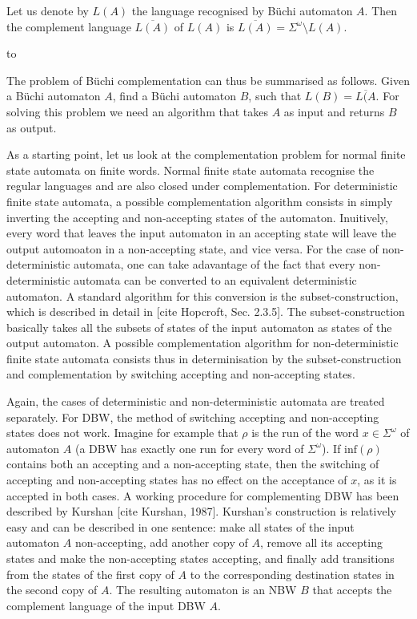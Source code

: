 \documentclass{scrreprt}
\begin{document}
Let us denote by $L(A)$ the language recognised by Büchi automaton $A$. Then the complement language $\overline{L(A)}$ of $L(A)$ is $\overline{L(A)} = \Sigma^\omega \setminus L(A)$.

\hbox to 

The problem of Büchi complementation can thus be summarised as follows. Given a Büchi automaton $A$, find a Büchi automaton $B$, such that $L(B) = \overline{L(A}$. For solving this problem we need an algorithm that takes $A$ as input and returns $B$ as output. 

As a starting point, let us look at the complementation problem for normal finite state automata on finite words. Normal finite state automata recognise the regular languages and are also closed under complementation. For deterministic finite state automata, a possible complementation algorithm consists in simply inverting the accepting and non-accepting states of the automaton. Inuitively, every word that leaves the input automaton in an accepting state will leave the output automoaton in a non-accepting state, and vice versa. For the case of non-deterministic automata, one can take adavantage of the fact that every non-deterministic automata can be converted to an equivalent deterministic automaton. A standard algorithm for this conversion is the subset-construction, which is described in detail in [cite Hopcroft, Sec. 2.3.5]. The subset-construction basically takes all the subsets of states of the input automaton as states of the output automaton. A possible complementation algorithm for non-deterministic finite state automata consists thus in determinisation by the subset-construction and complementation by switching accepting and non-accepting states.

Again, the cases of deterministic and non-deterministic automata are treated separately. For DBW, the method of switching accepting and non-accepting states does not work. Imagine for example that $\rho$ is the run of the word $x \in \Sigma^\omega$ of automaton $A$ (a DBW has exactly one run for every word of $\Sigma^\omega$). If $\textrm{inf}(\rho)$ contains both an accepting and a non-accepting state, then the switching of accepting and non-accepting states has no effect on the acceptance of $x$, as it is accepted in both cases. A working procedure for complementing DBW has been described by Kurshan [cite Kurshan, 1987]. Kurshan's construction is relatively easy and can be described in one sentence: make all states of the input automaton $A$ non-accepting, add another copy of $A$, remove all its accepting states and make the non-accepting states accepting, and finally add transitions from the states of the first copy of $A$ to the corresponding destination states in the second copy of $A$. The resulting automaton is an NBW $B$ that accepts the complement language of the input DBW $A$.
\end{document}
